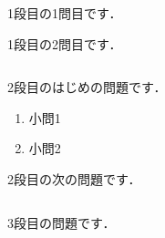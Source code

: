 \documentclass[b4paper,landscape,fleqn]{jarticle}
\begin{document}
%
%
%
%
\begin{sheet}%
  \begin{column}%
    \item 1段目の1問目です．
    \vfill
    \item 1段目の2問目です．
    \vfill
  \end{column}%
  \begin{column}%
    \item 2段目のはじめの問題です．
        \begin{enumerate}%
            \item 小問1
            \vfill
            \item 小問2
            \vfill
        \end{enumerate}
    \item 2段目の次の問題です．
    \vfill
  \end{column}%
  \begin{column}%
    \item 3段目の問題です．
  \end{column}%
\end{sheet}%
\end{document}

